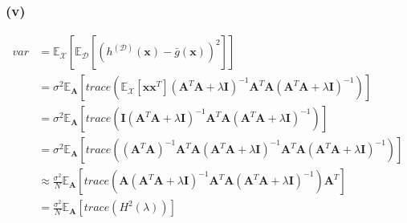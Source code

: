 \documentclass[11pt]{article}
\begin{document}
\subsubsection*{(v)}
\begin{equation}
\begin{split}
var &= \mathbb{E}_{\mathcal{X}} [\mathbb{E}_{\mathcal{D}}[(h^{(\mathcal{D})}(\pmb{x})-\bar{g}(\pmb{x}))^2]]\\
&=\sigma^2\mathbb{E}_{\pmb{A}}[trace(\mathbb{E}_{\mathcal{X}}[\pmb{x}\pmb{x}^T](\pmb{A}^T\pmb{A}+\lambda\pmb{I})^{-1}\pmb{A}^T\pmb{A}(\pmb{A}^T\pmb{A}+\lambda\pmb{I})^{-1})]\\
&=\sigma^2\mathbb{E}_{\pmb{A}}[trace(\pmb{I}(\pmb{A}^T\pmb{A}+\lambda\pmb{I})^{-1}\pmb{A}^T\pmb{A}(\pmb{A}^T\pmb{A}+\lambda\pmb{I})^{-1})]\\
&=\sigma^2\mathbb{E}_{\pmb{A}}[trace((\pmb{A}^T\pmb{A})^{-1}\pmb{A}^T\pmb{A}(\pmb{A}^T\pmb{A}+\lambda\pmb{I})^{-1}\pmb{A}^T\pmb{A}(\pmb{A}^T\pmb{A}+\lambda\pmb{I})^{-1})]\\
&\approx\frac{\sigma^2}{N}\mathbb{E}_{\pmb{A}}[trace(\pmb{A}(\pmb{A}^T\pmb{A}+\lambda\pmb{I})^{-1}\pmb{A}^T\pmb{A}(\pmb{A}^T\pmb{A}+\lambda\pmb{I})^{-1})\pmb{A}^T]\\
&=\frac{\sigma^2}{N}\mathbb{E}_{\pmb{A}}[trace(H^2(\lambda))]
\end{split}
\end{equation}
\end{document}
